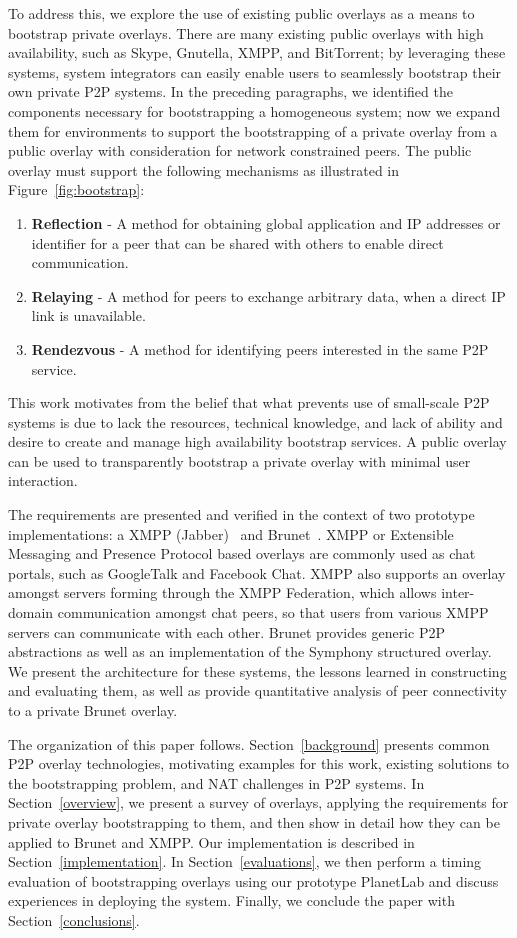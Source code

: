 \documentclass[conference]{IEEEtran}
\begin{document}
To address this, we explore the use of existing public overlays as a means to
bootstrap private overlays.  There are many existing public
overlays with high availability, such as Skype, Gnutella, XMPP, and BitTorrent;
by leveraging these systems, system integrators can easily enable users to
seamlessly bootstrap their own private P2P systems.  In the preceding
paragraphs, we identified the components necessary for bootstrapping a
homogeneous system; now we expand them for environments to support the
bootstrapping of a private overlay from a public overlay with consideration for
network constrained peers.  The public overlay must support the following
mechanisms as illustrated in Figure~\ref{fig:bootstrap}:
\begin{enumerate}
\item \textbf{Reflection} - A method for obtaining global application and
IP addresses or identifier for a peer that can be shared with others to enable
direct communication.
\item \textbf{Relaying} - A method for peers to exchange arbitrary data, when
a direct IP link is unavailable.
\item \textbf{Rendezvous} - A method for identifying peers interested in the
same P2P service.
\end{enumerate}
This work motivates from the belief that what prevents use of small-scale P2P
systems is due to lack the resources, technical knowledge, and lack of ability
and desire to create and manage high availability bootstrap services.  A public
overlay can be used to transparently bootstrap a private overlay with minimal
user interaction.

The requirements are presented and verified in the context of two prototype
implementations: a XMPP (Jabber)~\cite{xmpp} and Brunet~\cite{brunet}.  XMPP or
Extensible Messaging and Presence Protocol based overlays are commonly used as
chat portals, such as GoogleTalk and Facebook Chat.  XMPP also supports an
overlay amongst servers forming through the XMPP Federation, which allows
inter-domain communication amongst chat peers, so that users from various XMPP
servers can communicate with each other.  Brunet provides generic P2P
abstractions as well as an implementation of the Symphony structured overlay.
We present the architecture for these systems, the lessons learned in
constructing and evaluating them,  as well as provide quantitative analysis of
peer connectivity to a private Brunet overlay.

The organization of this paper follows.  Section~\ref{background} presents
common P2P overlay technologies, motivating examples for this work, existing
solutions to the bootstrapping problem, and NAT challenges in P2P systems.  In
Section~\ref{overview}, we present a survey of overlays, applying the
requirements for private overlay bootstrapping to them, and then show in detail
how they can be applied to Brunet and XMPP.  Our implementation is described in
Section~\ref{implementation}.  In Section~\ref{evaluations}, we then perform a
timing evaluation of bootstrapping overlays using our prototype PlanetLab and
discuss experiences in deploying the system.  Finally, we conclude the paper
with Section~\ref{conclusions}.
\end{document}
